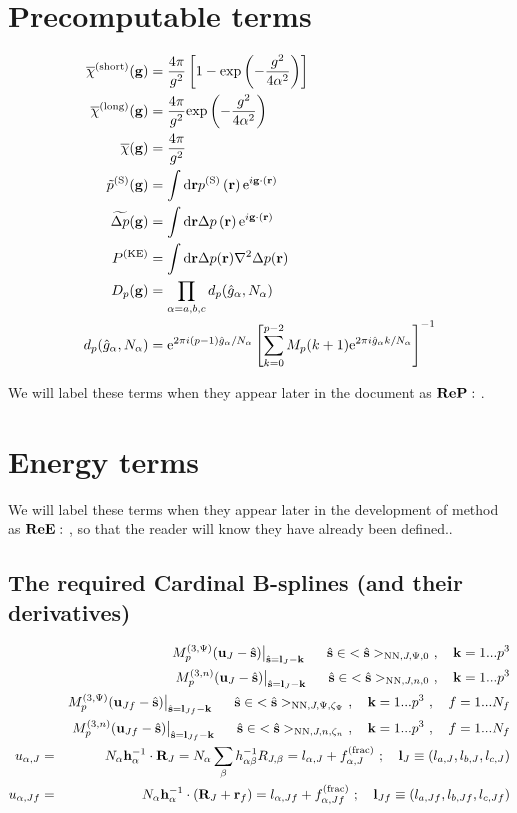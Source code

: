 \documentclass[paper=a4, fontsize=11pt]{article} %
\numberwithin{equation}{section} %
\numberwithin{figure}{section} %
\numberwithin{table}{section} %
\newcommand{\ol}{\overline}
\newcommand{\bh}{{\bf{h}}}
\newcommand{\bu}{{\bf{u}}}
\newcommand{\bl}{{\bf{l}}}
\newcommand{\bk}{{\bf{k}}}
\newcommand{\bs}{{\bf{s}}}
\newcommand{\bg}{{\bf{g}}}
\newcommand{\br}{{\bf{r}}}
\newcommand{\bR}{{\bf{R}}}
\newcommand{\hs}{{\hat{\bf{s}}}}
\newcommand{\rexp}{{\mathrm{exp}}}
\newcommand{\rS}{{\mathrm{S}}}
\newcommand{\rKE}{{\mathrm{KE}}}
\newcommand{\rNN}{{\mathrm{NN}}}
\newcommand{\re}{{\mathrm{e}}}
\newcommand{\rshort}{{\mathrm{short}}}
\newcommand{\rlong}{{\mathrm{long}}}
\newcommand{\rd}{{\mathrm{d}}}
\newcommand{\pabc}{\prod_{\alpha=a,b,c}}
\newcommand{\al}{{\alpha}}
\newcommand{\Mn}{{M_p^{(3,n)}}}
\newcommand{\Mp}{{M_p^{(3,\Psi)}}}
\newcommand{\hsJp}{{<\hs>_{\rNN,J,\Psi,\zeta_\Psi}}}
\newcommand{\hsJn}{{<\hs>_{\rNN,J,n,\zeta_n}}}
\newcommand{\hsJpzr}{{<\hs>_{\rNN,J,\Psi,0}}}
\newcommand{\hsJnzr}{{<\hs>_{\rNN,J,n,0}}}
\newcommand{\hsinJp}{{\ \ \ \ \ \hs  \in  \hsJp}}
\newcommand{\hsinJn}{{\ \ \ \ \ \hs  \in  \hsJn}}
\newcommand{\hsinJpzr}{{\ \ \ \ \ \hs  \in  \hsJpzr}}
\newcommand{\hsinJnzr}{{\ \ \ \ \ \hs  \in  \hsJnzr}}
\newcommand{\ReE}{{{\bf ReE:\ }}}
\newcommand{\ReP}{{{\bf ReP:\ }}}
\begin{document}
\setcounter{section}{0}
\appendix\section{Precomputable terms}
\begin{equation}\label{terms:pre}
\begin{split}
\ol \chi^{(\rshort)}(\bg) &= \frac{4\pi}{g^2} \left[1-\rexp\left(-\frac{g^2}{4\alpha^2}\right) \right]\\
\ol \chi^{(\rlong)}(\bg) &= \frac{4\pi}{g^2} \rexp\left(-\frac{g^2}{4\alpha^2}\right) \\
\ol \chi(\bg) &= \frac{4\pi}{g^2} \\
\tilde p^{(\rS)} (\bg) &= \int \rd\br  p^{(\rS)}\left( \br\right)\re^{ i \bg\cdot(\br)} \\
\widetilde {\Delta p} (\bg) &= \int \rd\br  \Delta p\left( \br\right)\re^{ i \bg\cdot(\br)}\\
P^{(\rKE)} 
& = \int \rd\br \Delta p(\br)\nabla^2 \Delta p(\br) \\
D_p(\bg) &= \pabc d_p(\hat{g}_{\alpha},N_\alpha) \\
d_p(\hat{g}_{\alpha},N_\alpha)  &= \re^{2\pi i (p-1) \hat{g}_{\alpha}/N_\alpha}\left[\sum_{k=0}^{p-2} M_p(k+1) \re^{2\pi i \hat{g}_{\alpha} k/N_\alpha}\right]^{-1} \\
\end{split}
\end{equation}

We will label these terms when they appear later in the document as $\ReP$.
\newpage

\section{Energy terms}\label{App:energy}

We will label these terms when they appear later in the development of method as $\ReE$, so that the reader will know they have already been defined..

\subsection{The required Cardinal B-splines (and their derivatives)}
\begin{eqnarray}
&&\Mp(\bu_{J}-\hat \bs)\big|_{\hs=\bl_J-\bk} \hsinJpzr \ , \ \ \ \bk= 1...p^3\\
&&\Mn(\bu_{J}-\hat \bs)\big|_{\hs=\bl_J-\bk} \hsinJnzr \ , \ \ \ \bk= 1...p^3\\
&&\Mp(\bu_{Jf}-\hat \bs)\big|_{\hs=\bl_{Jf}-\bk} \hsinJp \ , \ \ \ \bk= 1...p^3 \ , \ \ \ f= 1...N_f\\
&&\Mn(\bu_{Jf}-\hat \bs)\big|_{\hs=\bl_{Jf}-\bk} \hsinJn \ , \ \ \ \bk= 1...p^3 \ , \ \ \ f= 1...N_f\\
u_{\al,J} &=& N_\al \bh_\al^{-1}\cdot \bR_J = N_\al \sum_\beta h_{\al\beta}^{-1}R_{J,\beta} = l_{\al,J} + f^{(\mathrm{frac})}_{\al,J}\ ; \ \ \ \bl_J \equiv (l_{a,J},l_{b,J},l_{c,J}) \\
u_{\al,Jf} &=& N_\al \bh_\al^{-1}\cdot (\bR_J+\br_f) = l_{\al,Jf} + f^{(\mathrm{frac})}_{\al,Jf}\ ; \ \ \ \bl_{Jf} \equiv (l_{a,Jf},l_{b,Jf},l_{c,Jf})
\end{eqnarray}
\end{document}
